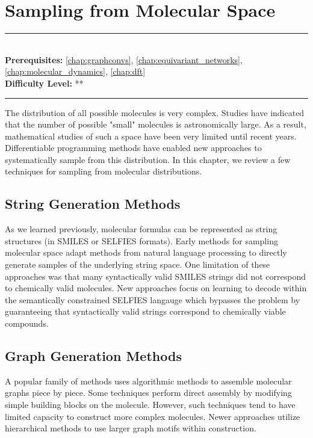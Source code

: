 \documentclass[book.tex]{subfiles}
\begin{document}
\chapter{Sampling from Molecular Space}
\label{chap:graph_generation}
\noindent\rule{11cm}{0.4pt} \\
\textbf{Prerequisites:} \autoref{chap:graphconvs}, \autoref{chap:equivariant_networks}, \autoref{chap:molecular_dynamics},  \autoref{chap:dft} \\
\textbf{Difficulty Level:} ** \\
\noindent\rule{11cm}{0.4pt}
\vspace{5mm}

The distribution of all possible molecules is very complex. Studies have indicated that the number of possible "small" molecules is astronomically large. As a result, mathematical studies of such a space have been very limited until recent years. Differentiable programming methods have enabled new approaches to systematically sample from this distribution. In this chapter, we review a few techniques for sampling from molecular distributions.

\section{String Generation Methods}

As we learned previously, molecular formulas can be represented as string structures (in SMILES or SELFIES formats). Early methods for sampling molecular space adapt methods from natural language processing to directly generate samples of the underlying string space. One limitation of these approaches was that many syntactically valid SMILES strings did not correspond to chemically valid molecules. New approaches focus on learning to decode within the semantically constrained SELFIES langauge which bypasses the problem by guaranteeing that syntactically valid strings correspond to chemically viable compounds.

\section{Graph Generation Methods}

A popular family of methods uses algorithmic methods to assemble molecular graphs piece by piece. Some techniques perform direct assembly by modifying simple building blocks on the molecule. However, such techniques tend to have limited capacity to construct more complex molecules. Newer approaches utilize hierarchical methods to use larger graph motifs within construction.
\end{document}
